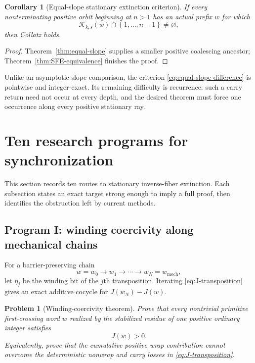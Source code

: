 \documentclass[11pt,reqno]{amsart}
\numberwithin{equation}{section}
\newtheorem{corollary}[theorem]{Corollary}
\newtheorem{problem}[theorem]{Problem}
\theoremstyle{definition}
\theoremstyle{remark}
\newcommand{\set}[1]{\left\{#1\right\}}
\begin{document}
\begin{corollary}[Equal-slope stationary extinction criterion]
If every nonterminating positive orbit beginning at $n>1$ has an actual
prefix $w$ for which
\begin{equation}\label{eq:equal-slope-spectrum-target}
\mathcal K_{k,s}(w)\cap\set{1,\ldots,n-1}\ne\varnothing,
\end{equation}
then Collatz holds.
\end{corollary}

\begin{proof}
Theorem~\ref{thm:equal-slope} supplies a smaller positive coalescing ancestor;
Theorem~\ref{thm:SFE-equivalence} finishes the proof.
\end{proof}

Unlike an asymptotic slope comparison, the criterion
\eqref{eq:equal-slope-difference} is pointwise and integer-exact.  Its
remaining difficulty is recurrence: such a carry return need not occur at
every depth, and the desired theorem must force one occurrence along every
positive stationary ray.

\section{Ten research programs for synchronization}\label{sec:programs}

This section records ten routes to stationary inverse-fiber extinction.  Each
subsection states an exact target strong enough to imply a full proof, then
identifies the obstruction left by current methods.

\subsection{Program I: winding coercivity along mechanical chains}

For a barrier-preserving chain
\[
w=w_0\to w_1\to\cdots\to w_N=w_{\mathrm{mech}},
\]
let $\eta_j$ be the winding bit of the $j$th transposition.  Iterating
\eqref{eq:J-transposition} gives an exact additive cocycle for $J(w_N)-J(w)$.

\begin{problem}[Winding-coercivity theorem]\label{prob:winding-coercivity}
Prove that every nontrivial primitive first-crossing word $w$ realized by the
stabilized residue of one positive ordinary integer satisfies
\begin{equation}\label{eq:winding-coercive-target}
J(w)>0.
\end{equation}
Equivalently, prove that the cumulative positive wrap contribution cannot
overcome the deterministic nonwrap and carry losses in
\eqref{eq:J-transposition}.
\end{problem}
\end{document}
